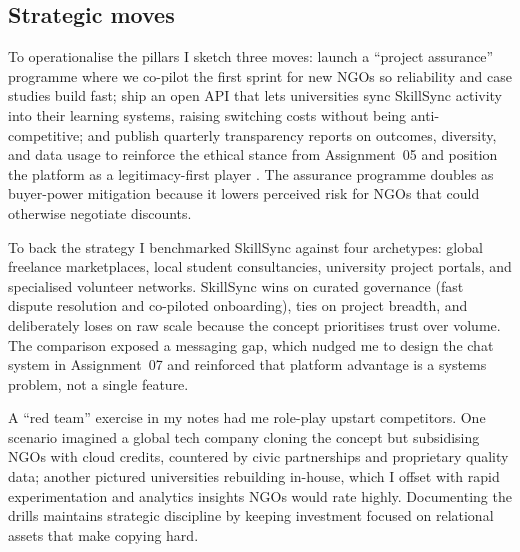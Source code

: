 \subsection*{Strategic moves}
To operationalise the pillars I sketch three moves: launch a ``project assurance'' programme where we co-pilot the first sprint for new NGOs so reliability and case studies build fast; ship an open API that lets universities sync SkillSync activity into their learning systems, raising switching costs without being anti-competitive; and publish quarterly transparency reports on outcomes, diversity, and data usage to reinforce the ethical stance from Assignment~05 and position the platform as a legitimacy-first player \citep{Srnicek2017,Zuboff2019}. The assurance programme doubles as buyer-power mitigation because it lowers perceived risk for NGOs that could otherwise negotiate discounts.

To back the strategy I benchmarked SkillSync against four archetypes: global freelance marketplaces, local student consultancies, university project portals, and specialised volunteer networks. SkillSync wins on curated governance (fast dispute resolution and co-piloted onboarding), ties on project breadth, and deliberately loses on raw scale because the concept prioritises trust over volume. The comparison exposed a messaging gap, which nudged me to design the chat system in Assignment~07 and reinforced that platform advantage is a systems problem, not a single feature.

A ``red team'' exercise in my notes had me role-play upstart competitors. One scenario imagined a global tech company cloning the concept but subsidising NGOs with cloud credits, countered by civic partnerships and proprietary quality data; another pictured universities rebuilding in-house, which I offset with rapid experimentation and analytics insights NGOs would rate highly. Documenting the drills maintains strategic discipline by keeping investment focused on relational assets that make copying hard.
